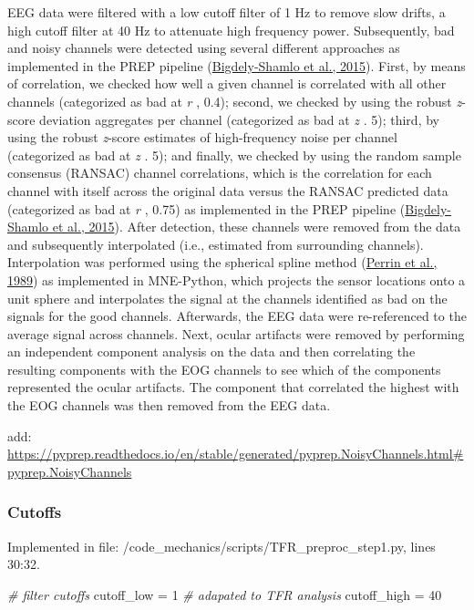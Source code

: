 \documentclass[
  man,floatsintext]{apa6}
\newenvironment{Shaded}{\begin{snugshade}}{\end{snugshade}}
\newcommand{\CommentTok}[1]{\textcolor[rgb]{0.56,0.35,0.01}{\textit{#1}}}
\newcommand{\DecValTok}[1]{\textcolor[rgb]{0.00,0.00,0.81}{#1}}
\newcommand{\NormalTok}[1]{#1}
\newcommand{\OtherTok}[1]{\textcolor[rgb]{0.56,0.35,0.01}{#1}}
\begin{document}
EEG data were filtered with a low cutoff filter of 1 Hz to remove slow drifts, a high cutoff filter at 40 Hz to attenuate high frequency power. Subsequently, bad and noisy channels were detected using several different approaches as implemented in the PREP pipeline (\protect\hyperlink{ref-bigdely-shamlo2015}{Bigdely-Shamlo et al., 2015}). First, by means of correlation, we checked how well a given channel is correlated with all other channels (categorized as bad at \emph{r} , 0.4); second, we checked by using the robust \emph{z}-score deviation aggregates per channel (categorized as bad at \emph{z} . 5); third, by using the robust \emph{z}-score estimates of high-frequency noise per channel (categorized as bad at \emph{z} . 5); and finally, we checked by using the random sample consensus (RANSAC) channel correlations, which is the correlation for each channel with itself across the original data versus the RANSAC predicted data (categorized as bad at \emph{r} , 0.75) as implemented in the PREP pipeline (\protect\hyperlink{ref-bigdely-shamlo2015}{Bigdely-Shamlo et al., 2015}). After detection, these channels were removed from the data and subsequently interpolated (i.e., estimated from surrounding channels). Interpolation was performed using the spherical spline method (\protect\hyperlink{ref-perrin1989}{Perrin et al., 1989}) as implemented in MNE-Python, which projects the sensor locations onto a unit sphere and interpolates the signal at the channels identified as bad on the signals for the good channels. Afterwards, the EEG data were re-referenced to the average signal across channels. Next, ocular artifacts were removed by performing an independent component analysis on the data and then correlating the resulting components with the EOG channels to see which of the components represented the ocular artifacts. The component that correlated the highest with the EOG channels was then removed from the EEG data.

add: \url{https://pyprep.readthedocs.io/en/stable/generated/pyprep.NoisyChannels.html\#pyprep.NoisyChannels}

\hypertarget{cutoffs}{%
\subsubsection{Cutoffs}\label{cutoffs}}

Implemented in file: /code\_mechanics/scripts/TFR\_preproc\_step1.py, lines 30:32.

\begin{Shaded}
\begin{Highlighting}[]
    \CommentTok{\# filter cutoffs}
\NormalTok{    cutoff\_low }\OtherTok{=} \DecValTok{1} \CommentTok{\# adapated to TFR analysis}
\NormalTok{    cutoff\_high }\OtherTok{=} \DecValTok{40}
\end{Highlighting}
\end{Shaded}
\end{document}
